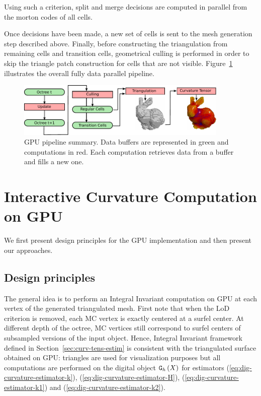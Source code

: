 \documentclass{llncs}
\begin{document}
%
Using such a criterion, split and merge decisions are computed in
parallel from the morton codes of all cells.

Once decisions have been made, a new set of cells is sent to the mesh
generation step described above.
Finally, before
constructing the triangulation from remaining cells and transition
cells, geometrical culling is performed in order to skip the triangle
patch construction for cells that are not visible. Figure~\ref{fig_pipeline}
illustrates the overall fully data parallel pipeline.

\begin{figure}[!htbp]
  \centering
  \includegraphics[width=0.9\textwidth]{figs/pipeline2}
  \caption{GPU pipeline summary. Data buffers are
    represented in green and computations in red. Each computation
    retrieves data from a buffer and fills a new one. }
  \label{fig_pipeline}
\end{figure}

\section{Interactive Curvature Computation on GPU}
\label{sec:inter-visu-gpu}

We first present design principles for the GPU implementation and then
present our approaches.

\subsection{Design principles}

The general idea is to perform an Integral Invariant computation on
GPU at each vertex of the generated triangulated mesh. First note that
when the LoD criterion is removed, each MC vertex is exactly centered at
a surfel center. At different depth of the octree, MC vertices still
correspond to surfel centers of subsampled versions of the input
object. Hence, Integral Invariant framework defined in
Section~\ref{sec:curv-tens-estim} is consistent with the triangulated
surface obtained on GPU: triangles are used for visualization purposes
but all computations are performed on the digital object $\mathtt{G}_{h}\left(X\right)$ for
estimators
(\ref{eq:dig-curvature-estimator-k}),
(\ref{eq:dig-curvature-estimator-H}), (\ref{eq:dig-curvature-estimator-k1})
and (\ref{eq:dig-curvature-estimator-k2}).
\end{document}
